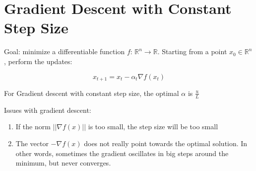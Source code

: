\documentclass[12pt,twoside]{article}
\newcommand{\R}{\mathbb{R}}
\begin{document}
\section*{Gradient Descent with Constant Step Size}
Goal: minimize a differentiable function $f$: $\R^n \rightarrow \R$. Starting from a point $x_0 \in \R^n$, perform the updates:

$$
    x_{t+1} = x_t - \alpha_t \nabla f(x_t)
$$

For Gradient descent with constant step size, the optimal $\alpha$ is $\frac{u}{L}$

Issues with gradient descent:
\begin{enumerate}
    \item If the norm $||\nabla f(x)||$ is too small, the step size will be too small
    \item The vector $-\nabla f(x)$ does not really point towards the optimal solution. In other words, sometimes the gradient oscillates in big steps around the minimum, but never converges.
\end{enumerate}
\end{document}
